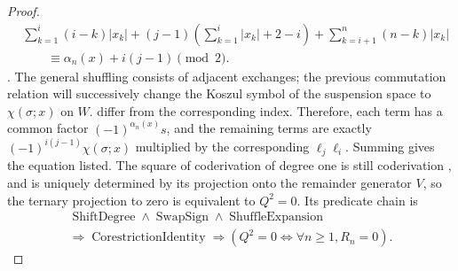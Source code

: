 \documentclass[12pt,a4paper,openany,notitlepage]{report}
\theoremstyle{plain}
\theoremstyle{definition}
\theoremstyle{remark}
\def\mathcal#1{#1}\def\mathsf#1{#1}\def\mathbb#1{#1}%
\begin{document}
\begin{CJK*}
\begin{proof}
\[ \begin{aligned}
 &\sum_{k=1}^{i}(i-k)|x_k|
 +(j-1)\left(\sum_{k=1}^{i}|x_k|+2-i\right)
 +\sum_{k=i+1}^{n}(n-k)|x_k|\\
 &\hspace{2em}\equiv\alpha_n(x)+i(j-1)\pmod2.
 \end{aligned}
\]. The general shuffling consists of adjacent exchanges; the previous commutation relation will successively change the Koszul symbol of the suspension space to $\chi(\sigma;x)$ on $W$. differ from the corresponding index. Therefore, each term has a common factor $(-1)^{\alpha_n(x)}s$, and the remaining terms are exactly $(-1)^{i(j-1)}\chi(\sigma;x)$ multiplied by the corresponding $\ell_j\ell_i$. Summing gives the equation listed. The square of coderivation of degree one is still coderivation , and is uniquely determined by its projection onto the remainder generator $V$, so the ternary projection to zero is equivalent to $Q^2=0$. Its predicate chain is \[
 \begin{gathered}
 \operatorname{ShiftDegree}\land\operatorname{SwapSign}\land
 \operatorname{ShuffleExpansion}\\
 \Rightarrow\operatorname{CorestrictionIdentity}
 \Rightarrow(Q^2=0\Longleftrightarrow\forall n\ge1,\mathcal R_n=0).
 \end{gathered}
\]\end{proof}



\end{CJK*}
\end{document}
